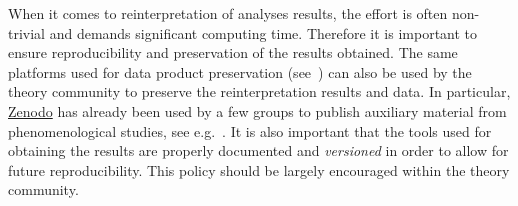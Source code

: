\documentclass[11pt]{article}
\begin{document}
When it comes to reinterpretation of analyses results, the effort is often non-trivial and demands significant computing time. Therefore it is important to ensure reproducibility and  preservation of the results obtained.
The same platforms used for data product preservation (see~) can also be used by the theory community to preserve the reinterpretation results and data.
In particular, \href{https://zenodo.org/}{Zenodo} has already been used by a few groups to publish auxiliary material from phenomenological studies, see e.g.~\cite{zenodo:LHCreinterpretation,zenodo:gambit}.
It is also important that the tools used for obtaining the results are properly documented and \emph{versioned} in order to allow for future reproducibility.
This policy should be largely encouraged within the theory community.


%
%
%
%
\end{document}
